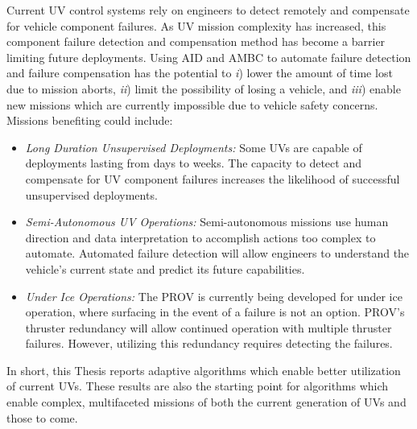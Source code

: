 Current \ac{UV} control systems rely on engineers to detect remotely and
compensate for vehicle component failures.
%
As \ac{UV} mission complexity has increased, this component failure
detection and compensation method has become a barrier limiting future
deployments.
%
Using \ac{AID} and \ac{AMBC} to automate failure detection and failure
compensation has the potential to {\it i}) lower the amount of time
lost due to mission aborts, {\it ii}) limit the possibility of losing
a vehicle, and {\it iii}) enable new missions which are currently
impossible due to vehicle safety concerns.  Missions benefiting could
include:
% 
\begin{itemize}
\item{\it Long Duration Unsupervised Deployments:} Some \ac{UV}s
are capable of deployments lasting from days to
weeks\cite{bellinghamTethys,kaminskiAUV2010}. The capacity to detect
and compensate for \ac{UV} component failures increases the likelihood
of successful unsupervised deployments.
%
\item{\it Semi-Autonomous \ac{UV} Operations:} Semi-autonomous
  missions use human direction and data interpretation to accomplish
  actions too complex to automate.  Automated failure detection will
  allow engineers to understand the vehicle's current state and
  predict its future capabilities.
% 
\item{\it Under Ice Operations:} The \ac{PROV} 
is currently being developed for under ice
operation\cite{PROV1,PROV2}, where surfacing in the event of a failure
is not an option.  \ac{PROV}'s thruster redundancy will allow continued
operation with multiple thruster failures.  However, utilizing this
redundancy requires detecting the failures. 
\end{itemize}


In short, this Thesis reports adaptive algorithms which enable better
utilization of current \acp{UV}.  These results are also the starting
point for algorithms which enable
complex, multifaceted missions of both the current generation of
\acp{UV} and those to come.

